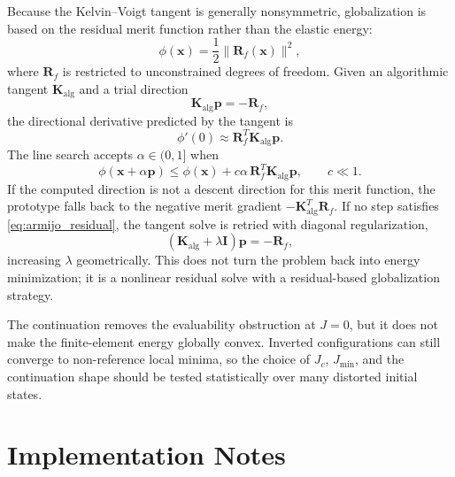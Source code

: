 \documentclass[11pt]{article}
\begin{document}
Because the Kelvin--Voigt tangent is generally nonsymmetric, globalization is
based on the residual merit function rather than the elastic energy:
\begin{equation}
  \phi(\bm x)=\frac{1}{2}\|\bm R_f(\bm x)\|^2,
  \label{eq:residual_merit}
\end{equation}
where $\bm R_f$ is restricted to unconstrained degrees of freedom. Given an
algorithmic tangent $\bm K_{\mathrm{alg}}$ and a trial direction
\begin{equation}
  \bm K_{\mathrm{alg}}\bm p=-\bm R_f,
\end{equation}
the directional derivative predicted by the tangent is
\begin{equation}
  \phi'(0)\approx \bm R_f^T\bm K_{\mathrm{alg}}\bm p.
\end{equation}
The line search accepts $\alpha\in(0,1]$ when
\begin{equation}
  \phi(\bm x+\alpha\bm p)
  \le
  \phi(\bm x)+c\alpha\,\bm R_f^T\bm K_{\mathrm{alg}}\bm p,
  \qquad c\ll1.
  \label{eq:armijo_residual}
\end{equation}
If the computed direction is not a descent direction for this merit function,
the prototype falls back to the negative merit gradient
$-\bm K_{\mathrm{alg}}^T\bm R_f$. If no step satisfies
\eqref{eq:armijo_residual}, the tangent solve is retried with diagonal
regularization,
\begin{equation}
  \left(\bm K_{\mathrm{alg}}+\lambda\bm I\right)\bm p=-\bm R_f,
\end{equation}
increasing $\lambda$ geometrically. This does not turn the problem back into
energy minimization; it is a nonlinear residual solve with a residual-based
globalization strategy.

The continuation removes the evaluability obstruction at $J=0$, but it does
not make the finite-element energy globally convex. Inverted configurations
can still converge to non-reference local minima, so the choice of $J_c$,
$J_{\min}$, and the continuation shape should be tested statistically over
many distorted initial states.

\section{Implementation Notes}
\end{document}
